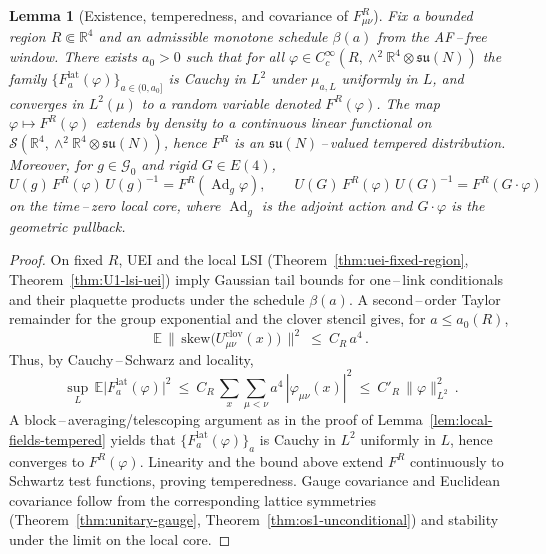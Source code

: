 \documentclass[11pt]{amsart}
\theoremstyle{plain}
\newtheorem{lemma}[theorem]{Lemma}
\theoremstyle{definition}
\theoremstyle{remark}
\begin{document}
\begin{lemma}[Existence, temperedness, and covariance of $F^R_{\mu\nu}$]\label{lem:FR-tempered}
Fix a bounded region $R\Subset\mathbb R^4$ and an admissible monotone schedule $\beta(a)$ from the AF\,–\,free window. There exists $a_0>0$ such that for all $\varphi\in C_c^\infty(R,\wedge^2\mathbb R^4\otimes\mathfrak{su}(N))$ the family $\{F^{\mathrm{lat}}_{a}(\varphi)\}_{a\in(0,a_0]}$ is Cauchy in $L^2$ under $\mu_{a,L}$ uniformly in $L$, and converges in $L^2(\mu)$ to a random variable denoted $F^R(\varphi)$. The map $\varphi\mapsto F^R(\varphi)$ extends by density to a continuous linear functional on $\mathcal S(\mathbb R^4,\wedge^2\mathbb R^4\otimes\mathfrak{su}(N))$, hence $F^R$ is an $\mathfrak{su}(N)$\,–\,valued tempered distribution. Moreover, for $g\in\mathcal G_0$ and rigid $G\in E(4)$,
\[
  U(g)\,F^R(\varphi)\,U(g)^{-1}=F^R(\operatorname{Ad}_{g}\varphi),\qquad U(G)\,F^R(\varphi)\,U(G)^{-1}=F^R(G\cdot\varphi)
\]
on the time\,–\,zero local core, where $\operatorname{Ad}_g$ is the adjoint action and $G\cdot\varphi$ is the geometric pullback.
\end{lemma}
\begin{proof}
On fixed $R$, UEI and the local LSI (Theorem~\ref{thm:uei-fixed-region}, Theorem~\ref{thm:U1-lsi-uei}) imply Gaussian tail bounds for one\,–\,link conditionals and their plaquette products under the schedule $\beta(a)$. A second\,–\,order Taylor remainder for the group exponential and the clover stencil gives, for $a\le a_0(R)$,
\[
  \mathbb E\,\big\|\,\mathrm{skew}\big(U^{\mathrm{clov}}_{\mu\nu}(x)\big)\,\big\|^2\ \le\ C_R\, a^4\,.
\]
Thus, by Cauchy\,–\,Schwarz and locality,
\[
  \sup_L\,\mathbb E\big|F^{\mathrm{lat}}_{a}(\varphi)\big|^2
   \ \le\ C_R\, \sum_{x}\sum_{\mu<\nu} a^4\, |\varphi_{\mu\nu}(x)|^2
   \ \le\ C'_R\, \|\varphi\|_{L^2}^2\,.
\]
A block\,–\,averaging/telescoping argument as in the proof of Lemma~\ref{lem:local-fields-tempered} yields that $\{F^{\mathrm{lat}}_{a}(\varphi)\}_a$ is Cauchy in $L^2$ uniformly in $L$, hence converges to $F^R(\varphi)$. Linearity and the bound above extend $F^R$ continuously to Schwartz test functions, proving temperedness. Gauge covariance and Euclidean covariance follow from the corresponding lattice symmetries (Theorem~\ref{thm:unitary-gauge}, Theorem~\ref{thm:os1-unconditional}) and stability under the limit on the local core.
\end{proof}
\end{document}
